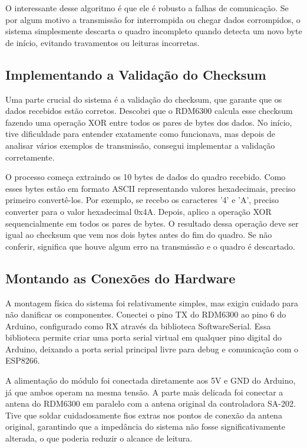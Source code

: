 O interessante desse algoritmo é que ele é robusto a falhas de comunicação. Se por algum motivo a transmissão for interrompida ou chegar dados corrompidos, o sistema simplesmente descarta o quadro incompleto quando detecta um novo byte de início, evitando travamentos ou leituras incorretas.

\subsection{Implementando a Validação do Checksum}

Uma parte crucial do sistema é a validação do checksum, que garante que os dados recebidos estão corretos. Descobri que o RDM6300 calcula esse checksum fazendo uma operação XOR entre todos os pares de bytes dos dados. No início, tive dificuldade para entender exatamente como funcionava, mas depois de analisar vários exemplos de transmissão, consegui implementar a validação corretamente.

O processo começa extraindo os 10 bytes de dados do quadro recebido. Como esses bytes estão em formato ASCII representando valores hexadecimais, preciso primeiro convertê-los. Por exemplo, se recebo os caracteres '4' e 'A', preciso converter para o valor hexadecimal 0x4A. Depois, aplico a operação XOR sequencialmente em todos os pares de bytes. O resultado dessa operação deve ser igual ao checksum que vem nos dois bytes antes do fim do quadro. Se não conferir, significa que houve algum erro na transmissão e o quadro é descartado.

\subsection{Montando as Conexões do Hardware}

A montagem física do sistema foi relativamente simples, mas exigiu cuidado para não danificar os componentes. Conectei o pino TX do RDM6300 ao pino 6 do Arduino, configurado como RX através da biblioteca SoftwareSerial. Essa biblioteca permite criar uma porta serial virtual em qualquer pino digital do Arduino, deixando a porta serial principal livre para debug e comunicação com o ESP8266.

A alimentação do módulo foi conectada diretamente aos 5V e GND do Arduino, já que ambos operam na mesma tensão. A parte mais delicada foi conectar a antena do RDM6300 em paralelo com a antena original da controladora SA-202. Tive que soldar cuidadosamente fios extras nos pontos de conexão da antena original, garantindo que a impedância do sistema não fosse significativamente alterada, o que poderia reduzir o alcance de leitura.

